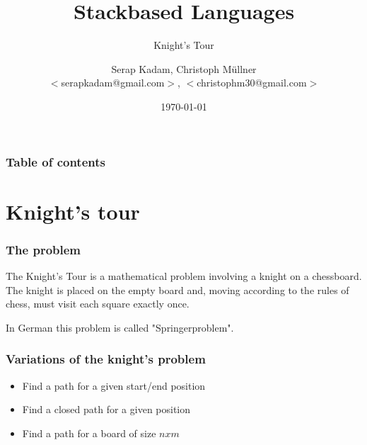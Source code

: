 \documentclass{beamer}
\begin{document}
\title{Stackbased Languages}
\author{Serap Kadam, Christoph M{\"u}llner \\
$<$serapkadam@gmail.com$>$, $<$christophm30@gmail.com$>$
}
\subtitle{Knight's Tour}

\date{\today} 

\begin{frame}
\titlepage
\end{frame}

\begin{frame}
\frametitle{Table of contents}
\tableofcontents
\end{frame} 

\section{Knight's tour} 
\begin{frame}
\frametitle{The problem}
The Knight's Tour is a mathematical problem involving a knight
on a chessboard. The knight is placed on the empty board and,
moving according to the rules of chess, must visit each square
exactly once.

In German this problem is called "Springerproblem".
\end{frame}

\begin{frame}
\frametitle{Variations of the knight's problem}
\begin{itemize}
	\item Find a path for a given start/end position
	\item Find a closed path for a given position
	\item Find a path for a board of size $n x m$
\end{itemize}
\end{frame}
\end{document}
